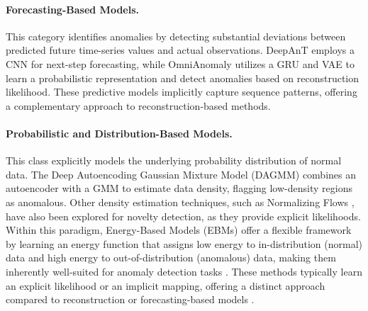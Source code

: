 \documentclass{article}
\begin{document}
\paragraph{Forecasting-Based Models.} 
This category identifies anomalies by detecting substantial deviations between predicted future time-series values and actual observations. DeepAnT \citep{munir_siddiqui_dengel_ahmed_2019} employs a CNN for next-step forecasting, while OmniAnomaly \citep{su_zhao_niu_liu_sun_pei_2019} utilizes a GRU and VAE to learn a probabilistic representation and detect anomalies based on reconstruction likelihood. These predictive models implicitly capture sequence patterns, offering a complementary approach to reconstruction-based methods.

\paragraph{Probabilistic and Distribution-Based Models.}
This class explicitly models the underlying probability distribution of normal data. The Deep Autoencoding Gaussian Mixture Model (DAGMM) \citep{zong_song_min_cheng_lumezanu_cho_chen_2018} combines an autoencoder with a GMM to estimate data density, flagging low-density regions as anomalous. Other density estimation techniques, such as Normalizing Flows \citep{rezende_mohamed_2015, dinh2017densityestimationusingreal, kingma2018glowgenerativeflowinvertible}, have also been explored for novelty detection, as they provide explicit likelihoods. Within this paradigm, Energy-Based Models (EBMs) offer a flexible framework by learning an energy function that assigns low energy to in-distribution (normal) data and high energy to out-of-distribution (anomalous) data, making them inherently well-suited for anomaly detection tasks \citep{nijkamp_hill_zhu_wu_2019, yoon_jin_noh_park_2023}. These methods typically learn an explicit likelihood or an implicit mapping, offering a distinct approach compared to reconstruction or forecasting-based models \citep{pang_shen_cao_van_2021}.
\end{document}
